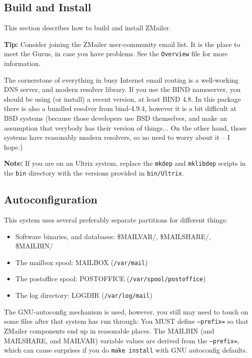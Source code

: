 \begin{htmlonly}


\section{Build and Install}
\end{htmlonly}

This section describes how to build and install ZMailer.

{\bf Tip:} Consider joining the ZMailer user-community email list.
It is the place to meet the Gurus, in case you have problems.
See the {\tt Overview} file for more information.

The cornerstone of everything in busy Internet email routing
is a well-working DNS server, and modern resolver library.
If you use the BIND nameserver, you should be using (or install)
a recent version, at least BIND 4.8. In this package there is also 
a bundled resolver from  bind-4.9.4, however it is a bit difficult at 
BSD systems (because those developers use BSD themselves, and make an 
assumption that verybody has their version of things...  On the other hand,
those systems have reasonably modern resolvers, so no need to worry about it
-- I hope.) 

{\bf Note:} If you are on an Ultrix system, replace the {\tt mkdep} and {\tt mklibdep}
scripts in the {\tt bin} directory with the versions provided in {\tt bin/Ultrix}.


\subsection{Autoconfiguration}

This system uses several preferably separate partitions for
different things:
\begin{itemize}
\item Software binaries, and databases: \$MAILVAR/, \$MAILSHARE/, \$MAILBIN/
\item The mailbox spool: MAILBOX ({\tt /var/mail})
\item The postoffice spool: POSTOFFICE ({\tt /var/spool/postoffice})
\item The log directory: LOGDIR ({\tt /var/log/mail})
\end{itemize}

The GNU-autoconfig mechanism is used, however, you still may need to
touch on some files after that system has run through:
You MUST define {\tt --prefix=} so that ZMailer components end up
in reasonable places.  The MAILBIN (and MAILSHARE, and MAILVAR)
variable values are derived from the {\tt --prefix=}, which can cause
surprises if you do {\tt make install} with GNU autoconfig defaults.

